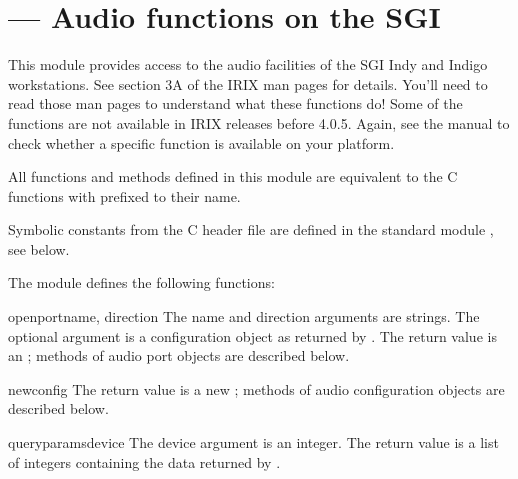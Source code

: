 \section{ ---
         Audio functions on the SGI}



This module provides access to the audio facilities of the SGI Indy
and Indigo workstations.  See section 3A of the IRIX man pages for
details.  You'll need to read those man pages to understand what these
functions do!  Some of the functions are not available in IRIX
releases before 4.0.5.  Again, see the manual to check whether a
specific function is available on your platform.

All functions and methods defined in this module are equivalent to
the C functions with  prefixed to their name.

Symbolic constants from the C header file  are
defined in the standard module
, see below.


The module defines the following functions:


\begin{funcdesc}{openport}{name, direction}
The name and direction arguments are strings.  The optional
 argument is a configuration object as returned by
.  The return value is an ; methods of audio port objects are described below.
\end{funcdesc}

\begin{funcdesc}{newconfig}{}
The return value is a new ; methods of
audio configuration objects are described below.
\end{funcdesc}

\begin{funcdesc}{queryparams}{device}
The device argument is an integer.  The return value is a list of
integers containing the data returned by .
\end{funcdesc}

